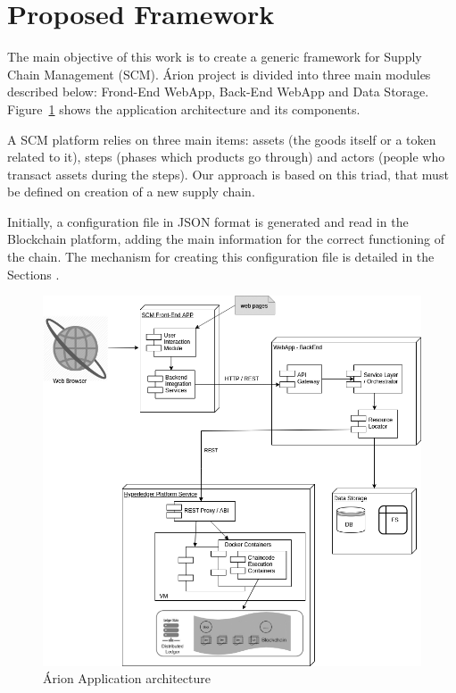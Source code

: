 \section{Proposed Framework} \label{sec:Technical}
The main objective of this work is to create a generic framework for Supply Chain Management (SCM). Árion project is divided into three main modules described below: Frond-End WebApp, Back-End WebApp and Data Storage. Figure~\ref{fig:detalhamentotecnico} shows the application architecture and its components.

A SCM platform relies on three main items: assets (the goods itself or a token related to it), steps (phases which products go through) and actors (people who transact assets during the steps). Our approach is based on this triad, that must be defined on creation of a new supply chain.

Initially, a configuration file in JSON format is generated and read in the Blockchain platform, adding the main information for the correct functioning of the chain. The mechanism for creating this configuration file is detailed in the Sections .

\begin{figure}[ht]
\begin{center}
  \includegraphics[scale=0.4]{images/detalhamentotecnico.png}
\caption{Árion Application architecture}
\label{fig:detalhamentotecnico}
\end{center}
\end{figure}

